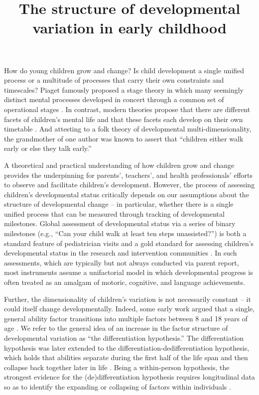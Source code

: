 \documentclass[man, floatsintext]{apa7}
\title{The structure of developmental variation in early childhood}
\begin{document}
\maketitle

How do young children grow and change? Is child development a single
uniﬁed process or a multitude of processes that carry their own
constraints and timescales? Piaget famously proposed a stage theory in
which many seemingly distinct mental processes developed in concert
through a common set of operational stages \parencite{flavell1963}. In contrast, modern
theories propose that there are different facets of children's mental
life and that these facets each develop on their own timetable \parencite{gelman1983}. And attesting to a folk theory of developmental multi-dimensionality, the
grandmother of one author was known to assert that
``children either walk early or else they talk early.''

A theoretical and practical understanding of how children grow and change
provides the underpinning for parents', teachers', and health professionals'
efforts to observe and facilitate children's development. However, the process of assessing
children's developmental status critically depends on our assumptions
about the structure of developmental change -- in particular, whether
there is a single uniﬁed process that can be measured through tracking
of developmental milestones. Global assessment of developmental status
via a series of binary milestones (e.g., ``Can your child walk at least
ten steps unassisted?'') is both a standard feature of pediatrician
visits and a gold standard for assessing children's developmental
status in the research and intervention communities \parencite{sheldrick2019,bayley2009,bricker1999,mccoy2019,weber2019}. In such
assessments, which are typically but not always conducted via parent
report, most
instruments assume a unifactorial model \parencite[although some also
provide subscale scores;][]{bayley2009} in which developmental progress is often treated as an
amalgam of motoric, cognitive, and language achievements. 

Further, the dimensionality of children's variation is not necessarily constant -- it could itself change developmentally.
Indeed, some early work argued that a single, general
ability factor transitions into multiple factors between 8 and 18 years of age
\parencite{garrett1946}. We refer to the general idea of an increase in the factor structure of developmental variation as ``the differentiation hypothesis.'' The differentiation hypothesis was later extended to the
differentiation-dedifferentiation hypothesis, which holds that abilities
separate during the first half of the life span and then collapse back
together later in life \parencite{lienert1964,tucker-drob2009,breit2020}. Being a within-person hypothesis, the
strongest evidence for the (de)differentiation hypothesis requires
longitudinal data so as to identify the expanding or collapsing of
factors within individuals \parencite{hulur2015}.
\end{document}

